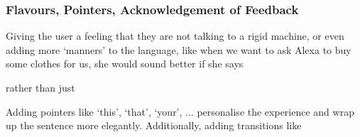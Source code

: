 \begin{flushright}
\end{flushright}





\subsubsection*{Flavours, Pointers, Acknowledgement of Feedback}
Giving the user a feeling that they are not talking to a rigid machine, or even adding more `manners' to the language, like when we want to ask Alexa to buy some clothes for us, she would sound better if she says 



\begin{flushright}
\end{flushright}


\noindent rather than just 


\begin{flushright}
\end{flushright}



\noindent Adding pointers like `this', `that', `your', ... personalise the experience and wrap up the sentence more elegantly. Additionally, adding transitions like 
\begin{flushright}
\end{flushright}



